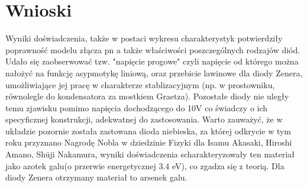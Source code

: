\documentclass{article}
\begin{document}
\section{Wnioski}

Wyniki doświadczenia, także w postaci wykresu charakterystyk potwierdziły poprawność modelu złącza pn a także właściwości poszczególnych rodzajów diód. Udało się zaobserwować tzw. "napięcie progowe" czyli napięcie od którego można nałożyć na funkcję asypmotykę liniową, oraz przebicie lawinowe dla diody Zenera, umożliwiające jej pracę w charakterze stablizacyjnym (np. w prostowniku, równolegle do kondensatora za mostkiem Graetza). Pozostałe diody nie uległy temu zjawisku pomimo napięcia dochodzącego do 10V co świadczy o ich specyficznej konstrukcji, adekwatnej do zastosowania. Warto zauważyć, że w układzie pozornie została zastowana dioda niebieska, za której odkrycie w tym roku przyznano Nagrodę Nobla w dziedzinie Fizyki dla Isamu Akasaki, Hiroshi Amano, Shūji Nakamura, wyniki doświadczenia scharakteryzowały ten materiał jako azotek galu(o przerwie energetycznej 3.4 eV), co zgadza się z teorią. Dla diody Zenera otrzymany materiał to arsenek galu.






\end{document}
